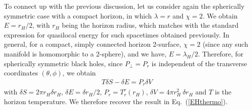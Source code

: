 \documentclass[12pt]{iopart}
\def\eq#1{{Eq.~(\ref{#1})}}
\begin{document}
To connect up with the previous discussion, let us consider again the spherically symmetric case with a compact horizon, in which $\lambda=r$ and $\chi=2$. We obtain $E=r_H/2$, with $r_H$ being the horizon radius, which matches with the standard expression for quasilocal energy for such spacetimes obtained previously. In general, for a compact, simply connected horizon 2-surface, $\chi=2$ (since any such manifold is homomorphic to a 2-sphere), and we have, $E = \lambda_H / 2$. Therefore, for spherically symmetric black holes, since $P_{\perp}=P_r$ is independent of the transverse coordinates $\left( \theta, \phi \right)$, we obtain
\begin{eqnarray}
T \delta S - \delta E = P_r \delta V
\end{eqnarray}
with $\delta S = 2 \pi r_H \delta r_H$, $\delta E = \delta r_H / 2$, $P_r = T^r_r(r_H)$, $\delta V = 4 \pi r_H^2 ~ \delta r_H$ and $T$ is the horizon temperature. We therefore recover the result in \eq{EHthermo}. 
 
\end{document}
